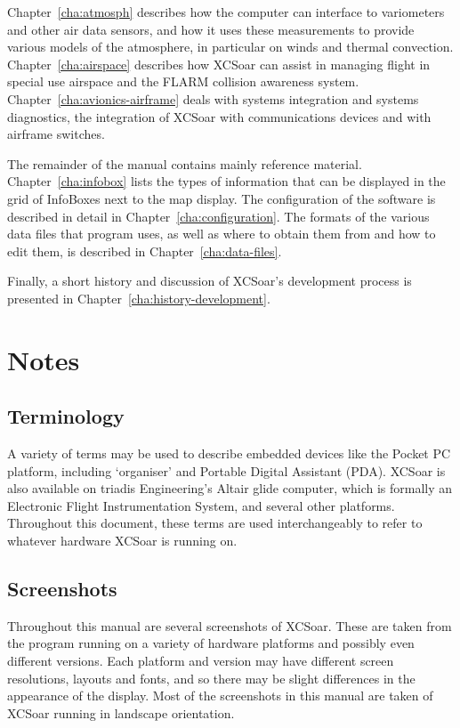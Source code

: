 \documentclass[a4paper,12pt]{refrep}
\begin{document}
Chapter~\ref{cha:atmosph} describes how the computer can interface to
variometers and other air data sensors, and how it uses these
measurements to provide various models of the atmosphere, in
particular on winds and thermal convection.
Chapter~\ref{cha:airspace} describes how XCSoar can assist in managing
flight in special use airspace and the FLARM collision awareness
system.  Chapter~\ref{cha:avionics-airframe} deals with systems
integration and systems diagnostics, the integration of XCSoar with
communications devices and with airframe switches.

The remainder of the manual contains mainly reference material.
Chapter~\ref{cha:infobox} lists the types of information that can be
displayed in the grid of InfoBoxes next to the map display.  The
configuration of the software is described in detail in
Chapter~\ref{cha:configuration}.  The formats of the various data
files that program uses, as well as where to obtain them from and how
to edit them, is described in Chapter~\ref{cha:data-files}.

Finally, a short history and discussion of XCSoar's development
process is presented in Chapter~\ref{cha:history-development}.

\section{Notes}

\subsection*{Terminology}
A variety of terms may be used to describe embedded devices like the Pocket PC
platform, including `organiser' and Portable Digital Assistant (PDA).  XCSoar is
also available on triadis Engineering's Altair glide computer, which is
formally an Electronic Flight Instrumentation System, and several other
platforms. Throughout this document, these terms are used interchangeably to
refer to whatever hardware XCSoar is running on.

\subsection*{Screenshots}
Throughout this manual are several screenshots of XCSoar. These are
taken from the program running on a variety of hardware platforms and possibly
even different versions. Each platform and version may have different screen
resolutions, layouts and fonts, and so there may be slight differences in the
appearance of the display. Most of the screenshots in this manual are taken of
XCSoar running in landscape orientation.
\end{document}
